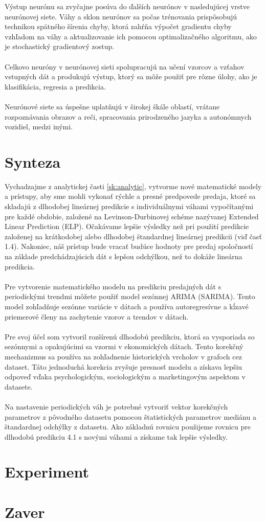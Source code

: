     Výstup neurónu sa zvyčajne posúva do ďalších neurónov v nasledujúcej vrstve neurónovej siete. Váhy a sklon neurónov sa počas trénovania
    prispôsobujú technikou spätného šírenia chyby, ktorá zahŕňa výpočet gradientu chyby vzhľadom na váhy a aktualizovanie ich pomocou
    optimalizačného algoritmu, ako je stochastický gradientový zostup.\\
    \\
    Celkovo neuróny v neurónovej sieti spolupracujú na učení vzorcov a vzťahov vstupných dát a produkujú výstup, ktorý sa môže použiť pre rôzne
    úlohy, ako je klasifikácia, regresia a predikcia.\\
    \\
    Neurónové siete sa úspešne uplatňujú v širokej škále oblastí, vrátane rozpoznávania obrazov a reči, spracovania prirodzeného
    jazyka a autonómnych vozidiel, medzi inými.
    \section{Synteza}
    Vychadzajme z analytickej časti \ref{sk:analytic}, vytvorme nové matematické modely a prístupy, aby sme mohli vykonať rýchle a presné predpovede predaja,
    ktoré sa skladajú z dlhodobej lineárnej predikcie s individuálnymi váhami vypočítanými pre každé obdobie, založené na Levinson-Durbinovej schéme
    nazývanej Extended Linear Prediction (ELP). Očakávame lepšie výsledky než pri použití predikcie založenej na krátkodobej alebo
    dlhodobej štandardnej lineárnej predikcii (viď časť 1.4). Nakoniec, náš prístup bude vracať budúce hodnoty pre predaj spoločností na základe
    predchádzajúcich dát s lepšou odchýlkou, než to dokáže lineárna predikcia.\\
    \\
    Pre vytvorenie matematického modelu na predikciu predajných dát s periodickými trendmi môžete použiť model sezónnej ARIMA (SARIMA).
    Tento model zohľadňuje sezónne variácie v dátach a používa autoregresívne a kĺzavé priemerové členy na zachytenie vzorov a trendov v dátach.\\
    \\
    Pre svoj účel som vytvoril rozšírenú dlhodobú predikciu, ktorá sa vysporiada so sezónnymi a opakujúcimi sa vzormi v ekonomických dátach.
    Tento korekčný mechanizmus sa používa na zohľadnenie historických vrcholov v grafoch cez dataset. Táto jednoduchá korekcia zvyšuje
    presnosť modelu a získava lepšiu odpoveď vďaka psychologickým, sociologickým a marketingovým aspektom v datasete.\\
    \\
    Na nastavenie periodických váh je potrebné vytvoriť vektor korekčných parametrov z pôvodného datasetu pomocou štatistických parametrov
    mediánu a štandardnej odchýlky z datasetu. Ako základnú rovnicu použijeme rovnicu pre dlhodobú predikciu 4.1 s novými váhami a získame tak lepšie výsledky.
    \section{Experiment}
    \section{Zaver}